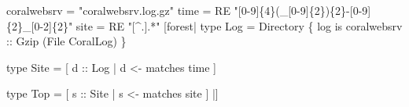 \begin{code}
[pads|
  type WebSrv = ...
|]
\mbox{}
coralwebsrv = "coralwebsrv.log.gz"
time = RE "[0-9]\{4\}(_[0-9]\{2\})\{2\}-[0-9]\{2\}_[0-2]\{2\}"
site = RE "[^.].*"
\mbox{}
[forest|
  type Log = Directory 
    \{ log is coralwebsrv :: Gzip (File CoralLog) \}

  type Site = [ d :: Log | d <- matches time ]

  type Top = [ s :: Site | s <- matches site ]
|]
\end{code}